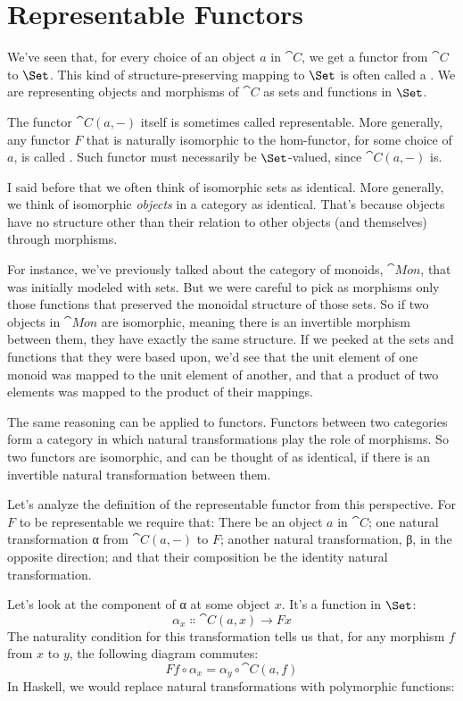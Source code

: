 \section{Representable Functors}

We've seen that, for every choice of an object $a$ in $\cat{C}$,
we get a functor from $\cat{C}$ to $\Set$. This kind of
structure-preserving mapping to $\Set$ is often called a
. We are representing objects and morphisms of
$\cat{C}$ as sets and functions in $\Set$.

The functor $\cat{C}(a, -)$ itself is sometimes called representable.
More generally, any functor $F$ that is naturally isomorphic to
the hom-functor, for some choice of $a$, is called
. Such functor must necessarily be
$\Set$-valued, since $\cat{C}(a, -)$ is.

I said before that we often think of isomorphic sets as identical. More
generally, we think of isomorphic \emph{objects} in a category as
identical. That's because objects have no structure other than their
relation to other objects (and themselves) through morphisms.

For instance, we've previously talked about the category of monoids,
$\cat{Mon}$, that was initially modeled with sets. But we were careful
to pick as morphisms only those functions that preserved the monoidal
structure of those sets. So if two objects in $\cat{Mon}$ are
isomorphic, meaning there is an invertible morphism between them, they
have exactly the same structure. If we peeked at the sets and functions
that they were based upon, we'd see that the unit element of one monoid
was mapped to the unit element of another, and that a product of two
elements was mapped to the product of their mappings.

The same reasoning can be applied to functors. Functors between two
categories form a category in which natural transformations play the
role of morphisms. So two functors are isomorphic, and can be thought of
as identical, if there is an invertible natural transformation between
them.

Let's analyze the definition of the representable functor from this
perspective. For $F$ to be representable we require that: There
be an object $a$ in $\cat{C}$; one natural transformation α from
$\cat{C}(a, -)$ to $F$; another natural transformation, β, in
the opposite direction; and that their composition be the identity
natural transformation.

Let's look at the component of α at some object $x$. It's a
function in $\Set$:
\[\alpha_x \Colon \cat{C}(a, x) \to F x\]
The naturality condition for this transformation tells us that, for any
morphism $f$ from $x$ to $y$, the following diagram
commutes:
\[F f \circ \alpha_x = \alpha_y \circ \cat{C}(a, f)\]
In Haskell, we would replace natural transformations with polymorphic
functions:

